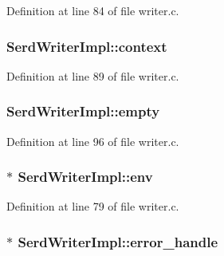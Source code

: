 Definition at line 84 of file writer.\+c.

\subsubsection[{\texorpdfstring{context}{context}}]{ Serd\+Writer\+Impl\+::context}\hypertarget{struct_serd_writer_impl_aba094b25116ebac728a7b329f45f1196}{}\label{struct_serd_writer_impl_aba094b25116ebac728a7b329f45f1196}


Definition at line 89 of file writer.\+c.

\subsubsection[{\texorpdfstring{empty}{empty}}]{ Serd\+Writer\+Impl\+::empty}\hypertarget{struct_serd_writer_impl_af311634690e4a79ccacbac2d24f77b3c}{}\label{struct_serd_writer_impl_af311634690e4a79ccacbac2d24f77b3c}


Definition at line 96 of file writer.\+c.

\subsubsection[{\texorpdfstring{env}{env}}]{$\ast$ Serd\+Writer\+Impl\+::env}\hypertarget{struct_serd_writer_impl_a817b3f152080fae12294fcab0976e3fc}{}\label{struct_serd_writer_impl_a817b3f152080fae12294fcab0976e3fc}


Definition at line 79 of file writer.\+c.

\subsubsection[{\texorpdfstring{error\+\_\+handle}{error_handle}}]{$\ast$ Serd\+Writer\+Impl\+::error\+\_\+handle}\hypertarget{struct_serd_writer_impl_a4f4255f8e32c3e1c7dfc0145fefc7788}{}\label{struct_serd_writer_impl_a4f4255f8e32c3e1c7dfc0145fefc7788}


